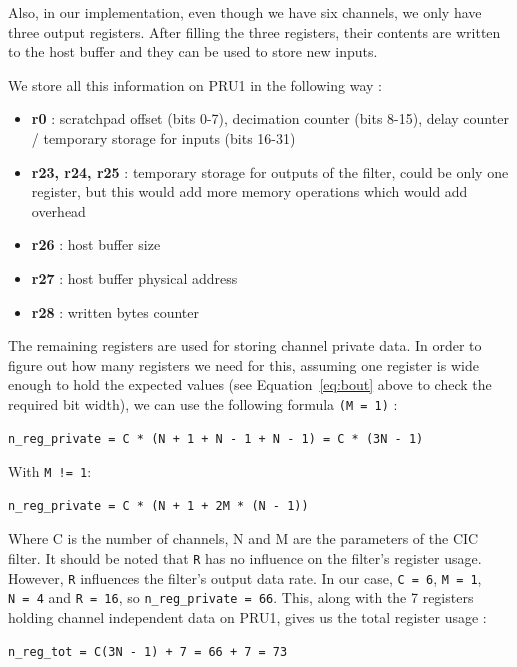 \documentclass[]{report}
\providecommand{\tightlist}{%
	\setlength{\itemsep}{0pt}\setlength{\parskip}{0pt}}
\begin{document}
Also, in our implementation, even though we have six channels, we only have three output registers. After filling the three registers, their contents are written to the host buffer and they can be used to store new inputs.

We store all this information on PRU1 in the following way :

\begin{itemize}
\tightlist
\item
  \textbf{r0} : scratchpad offset (bits 0-7), decimation counter (bits
  8-15), delay counter / temporary storage for inputs (bits 16-31)
\item
  \textbf{r23, r24, r25} : temporary storage for outputs of the filter,
  could be only one register, but this would add more memory operations
  which would add overhead
\item
  \textbf{r26} : host buffer size
\item
  \textbf{r27} : host buffer physical address
\item
  \textbf{r28} : written bytes counter
\end{itemize}

The remaining registers are used for storing channel private data. In order to figure out how many registers we need for this, assuming one register is wide enough to hold the expected values (see Equation~\ref{eq:bout} above to check the required bit width), we can use the following formula \texttt{(M = 1)} :

\begin{verbatim}
n_reg_private = C * (N + 1 + N - 1 + N - 1) = C * (3N - 1)
\end{verbatim}

\noindent With \texttt{M\ !=\ 1}:

\begin{verbatim}
n_reg_private = C * (N + 1 + 2M * (N - 1))
\end{verbatim}

Where C is the number of channels, N and M are the parameters of the CIC
filter. It should be noted that \texttt{R} has no influence on the
filter's register usage. However, \texttt{R} influences the filter's
output data rate. In our case, \texttt{C\ =\ 6}, \texttt{M\ =\ 1},
\texttt{N\ =\ 4} and \texttt{R\ =\ 16}, so
\texttt{n\_reg\_private\ =\ 66}. This, along with the 7 registers holding channel independent data on
PRU1, gives us the total register usage :

\begin{verbatim}
n_reg_tot = C(3N - 1) + 7 = 66 + 7 = 73
\end{verbatim}
\end{document}
